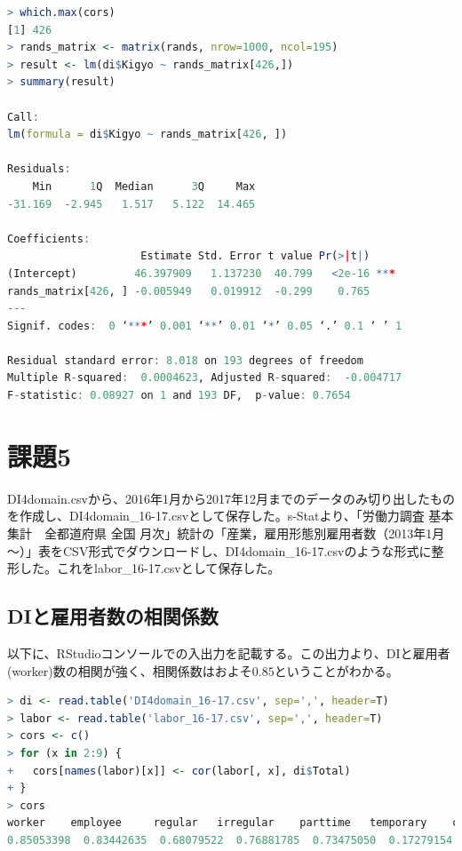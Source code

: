\documentclass{jsarticle}
\begin{document}
\begin{lstlisting}[language=r]
> which.max(cors)
[1] 426
> rands_matrix <- matrix(rands, nrow=1000, ncol=195)
> result <- lm(di$Kigyo ~ rands_matrix[426,])
> summary(result)

Call:
lm(formula = di$Kigyo ~ rands_matrix[426, ])

Residuals:
    Min      1Q  Median      3Q     Max 
-31.169  -2.945   1.517   5.122  14.465 

Coefficients:
                     Estimate Std. Error t value Pr(>|t|)    
(Intercept)         46.397909   1.137230  40.799   <2e-16 ***
rands_matrix[426, ] -0.005949   0.019912  -0.299    0.765    
---
Signif. codes:  0 ‘***’ 0.001 ‘**’ 0.01 ‘*’ 0.05 ‘.’ 0.1 ‘ ’ 1

Residual standard error: 8.018 on 193 degrees of freedom
Multiple R-squared:  0.0004623,	Adjusted R-squared:  -0.004717 
F-statistic: 0.08927 on 1 and 193 DF,  p-value: 0.7654

\end{lstlisting}

\section{課題5}

DI4domain.csvから、2016年1月から2017年12月までのデータのみ切り出したものを作成し、DI4domain\_16-17.csvとして保存した。s-Statより、「労働力調査 基本集計　全都道府県 全国 月次」統計の「産業，雇用形態別雇用者数（2013年1月～）」表をCSV形式でダウンロードし、DI4domain\_16-17.csvのような形式に整形した。これをlabor\_16-17.csvとして保存した。

\subsection{DIと雇用者数の相関係数}

以下に、RStudioコンソールでの入出力を記載する。この出力より、DIと雇用者(worker)数の相関が強く、相関係数はおよそ$0.85$ということがわかる。

\begin{lstlisting}[language=r]
> di <- read.table('DI4domain_16-17.csv', sep=',', header=T)
> labor <- read.table('labor_16-17.csv', sep=',', header=T)
> cors <- c()
> for (x in 2:9) {
+   cors[names(labor)[x]] <- cor(labor[, x], di$Total)
+ }
> cors
worker    employee     regular   irregular    parttime   temporary    contract   parttime2 
0.85053398  0.83442635  0.68079522  0.76881785  0.73475050  0.17279154  0.34709905 -0.02946126 
\end{lstlisting}
\end{document}
